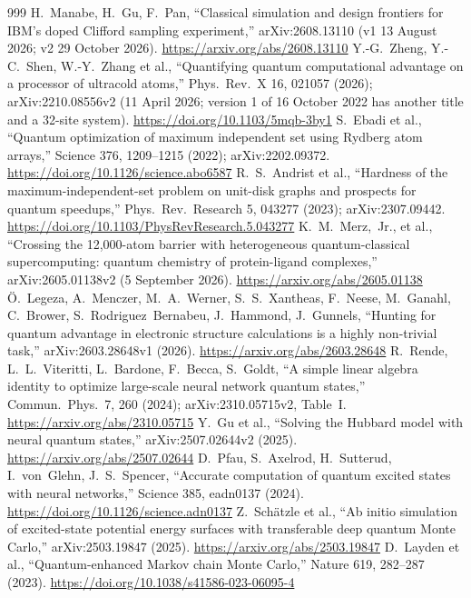 \documentclass[10pt,a4paper]{article}
\begin{document}
\begin{thebibliography}{999}
 H.~Manabe, H.~Gu, F.~Pan, ``Classical simulation and design frontiers for IBM's doped Clifford sampling experiment,'' arXiv:2608.13110 (v1 13 August 2026; v2 29 October 2026). \url{https://arxiv.org/abs/2608.13110}
 Y.-G.~Zheng, Y.-C.~Shen, W.-Y.~Zhang et al., ``Quantifying quantum computational advantage on a processor of ultracold atoms,'' Phys.\ Rev.\ X 16, 021057 (2026); arXiv:2210.08556v2 (11 April 2026; version 1 of 16 October 2022 has another title and a 32-site system). \url{https://doi.org/10.1103/5mqb-3by1}
 S.~Ebadi et al., ``Quantum optimization of maximum independent set using Rydberg atom arrays,'' Science 376, 1209--1215 (2022); arXiv:2202.09372. \url{https://doi.org/10.1126/science.abo6587}
 R.~S.~Andrist et al., ``Hardness of the maximum-independent-set problem on unit-disk graphs and prospects for quantum speedups,'' Phys.\ Rev.\ Research 5, 043277 (2023); arXiv:2307.09442. \url{https://doi.org/10.1103/PhysRevResearch.5.043277}
 K.~M.~Merz,~Jr., et al., ``Crossing the 12,000-atom barrier with heterogeneous quantum-classical supercomputing: quantum chemistry of protein-ligand complexes,'' arXiv:2605.01138v2 (5 September 2026). \url{https://arxiv.org/abs/2605.01138}
 \"O.~Legeza, A.~Menczer, M.~A.~Werner, S.~S.~Xantheas, F.~Neese, M.~Ganahl, C.~Brower, S.~Rodriguez~Bernabeu, J.~Hammond, J.~Gunnels, ``Hunting for quantum advantage in electronic structure calculations is a highly non-trivial task,'' arXiv:2603.28648v1 (2026). \url{https://arxiv.org/abs/2603.28648}
 R.~Rende, L.~L.~Viteritti, L.~Bardone, F.~Becca, S.~Goldt, ``A simple linear algebra identity to optimize large-scale neural network quantum states,'' Commun.\ Phys.\ 7, 260 (2024); arXiv:2310.05715v2, Table~I. \url{https://arxiv.org/abs/2310.05715}
 Y.~Gu et al., ``Solving the Hubbard model with neural quantum states,'' arXiv:2507.02644v2 (2025). \url{https://arxiv.org/abs/2507.02644}
 D.~Pfau, S.~Axelrod, H.~Sutterud, I.~von~Glehn, J.~S.~Spencer, ``Accurate computation of quantum excited states with neural networks,'' Science 385, eadn0137 (2024). \url{https://doi.org/10.1126/science.adn0137}
 Z.~Sch\"atzle et al., ``Ab initio simulation of excited-state potential energy surfaces with transferable deep quantum Monte Carlo,'' arXiv:2503.19847 (2025). \url{https://arxiv.org/abs/2503.19847}
 D.~Layden et al., ``Quantum-enhanced Markov chain Monte Carlo,'' Nature 619, 282--287 (2023). \url{https://doi.org/10.1038/s41586-023-06095-4}

\end{thebibliography}
\end{document}
